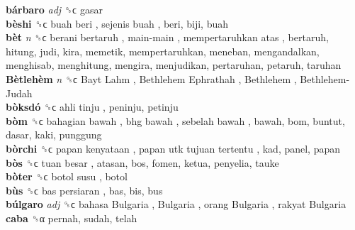 \textbf{bárbaro} \emph{adj}  ␝ϲ  gasar  \\
\textbf{bèshi} ␝ϲ   buah beri ,  sejenis buah , beri, biji, buah  \\
\textbf{bèt} \emph{n}  ␝ϲ   berani bertaruh ,  main-main ,  mempertaruhkan atas , bertaruh, hitung, judi, kira, memetik, mempertaruhkan, meneban, mengandalkan, menghisab, menghitung, mengira, menjudikan, pertaruhan, petaruh, taruhan  \\
\textbf{Bètlehèm} \emph{n}  ␝ϲ   Bayt Lahm ,  Bethlehem Ephrathah ,  Bethlehem ,  Bethlehem-Judah   \\
\textbf{bòksdó} ␝ϲ   ahli tinju , peninju, petinju  \\
\textbf{bòm} ␝ϲ   bahagian bawah ,  bhg bawah ,  sebelah bawah , bawah, bom, buntut, dasar, kaki, punggung  \\
\textbf{bòrchi} ␝ϲ   papan kenyataan ,  papan utk tujuan tertentu , kad, panel, papan  \\
\textbf{bòs} ␝ϲ   tuan besar , atasan, bos, fomen, ketua, penyelia, tauke  \\
\textbf{bòter} ␝ϲ   botol susu , botol  \\
\textbf{bùs} ␝ϲ   bas persiaran , bas, bis, bus  \\
\textbf{búlgaro} \emph{adj}  ␝ϲ   bahasa Bulgaria ,  Bulgaria ,  orang Bulgaria ,  rakyat Bulgaria   \\
\textbf{caba} ␝α  pernah, sudah, telah  \\
